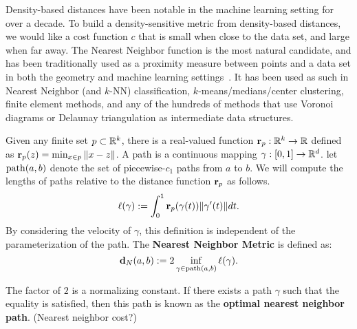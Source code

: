 Density-based distances have been notable in the machine learning setting
for over a decade. To build a density-sensitive metric from density-based
distances, we would like a cost function $c$ that is small when close to
the data set, and large when far away. The Nearest Neighbor function is the
most natural candidate, and has been traditionally used as a proximity
measure between points and a data set in both the geometry and machine
learning settings~\cite{}. It has been used as such in Nearest Neighbor
(and $k$-NN) classification, $k$-means/medians/center clustering, finite
element methods, and any of the hundreds of methods that use Voronoi
diagrams or Delaunay triangulation as intermediate data structures.

\begin{definition} Given any finite set $p\subset \mathbb{R}^k$, there is a
	real-valued function $\mathbf{r}_p: \mathbb{R}^k\to \mathbb{R}$ defined as
	$\mathbf{r}_p(z) = \min_{x\in p} \|x-z\|$.  A path is a continuous
	mapping $\gamma:[0,1]\to \mathbb{R}^d$.  let $\mathrm{path}(a,b)$ denote the set
	of piecewise-$c_1$ paths from $a$ to $b$.  We will compute the
	lengths of paths relative to the distance function $\mathbf{r}_p$ as
	follows.
 \[ \ell(\gamma) := \int_0^1
\mathbf{r}_p(\gamma(t))\|\gamma'(t)\|dt.  \] By considering the
velocity of $\gamma$, this definition is independent of the
parameterization of the path.  The \textbf{Nearest Neighbor Metric}
is defined as: \[ \mathbf{d}_N(a,b) := 2 \inf_{\gamma\in
\mathrm{path}(a,b)}\ell(\gamma).
\]

The factor of $2$ is a normalizing constant. If there exists a path
$\gamma$ such that the equality is satisfied, then this path is known as
the \textbf{optimal nearest neighbor path}. (Nearest neighbor cost?)
\end{definition}


